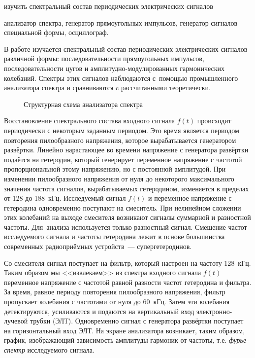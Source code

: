 
\begin{lab:aim}
	изучить спектральный состав периодических электрических сигналов
\end{lab:aim}

\begin{lab:equipment}
	анализатор спектра, генератор прямоугольных импульсов, генератор сигналов специальной формы, осциллограф.
\end{lab:equipment}

В работе изучается спектральный состав периодических электрических сигналов различной формы: последовательности прямоугольных импульсов, последовательности цугов и амплитудно-модулированных гармонических колебаний. Спектры этих сигналов наблюдаются с~помощью промышленного анализатора спектра и сравниваются c рассчитанными теоретически.

%

\begin{figure}
	\label{fig:1}
	\caption{Структурная схема анализатора спектра}
\end{figure}

Восстановление спектрального состава входного сигнала $f(t)$ происходит периодически с некоторым заданным периодом. Это время является периодом повторения пилообразного напряжения, которое вырабатывается генератором развёртки. Линейно нарастающее во времени напряжение с генератора развёртки подаётся на гетеродин, который генерирует переменное напряжение с частотой пропорциональной этому напряжению, но с постоянной амплитудой. При изменении пилообразного напряжения от нуля до некоторого максимального значения частота сигналов, вырабатываемых гетеродином, изменяется в пределах от 128 до 188~кГц. Исследуемый сигнал $f(t)$ и переменное напряжение с гетеродина одновременно поступают на смеситель. При нелинейном сложении этих колебаний на выходе смесителя возникают сигналы суммарной и разностной частоты. Для~анализа используется только разностный сигнал. Смешение частот исследуемого сигнала и частоты гетеродина лежит в основе большинства современных радиоприёмных устройств~--- супергетеродинов.

Со смесителя сигнал поступает на фильтр, который настроен на частоту 128~кГц. Таким образом мы <<извлекаем>> из спектра входного  сигнала $f(t)$ переменное напряжение с частотой равной разности частот гетеродина и фильтра. За время, равное периоду повторения пилообразного напряжения, фильтр пропускает колебания с частотами от нуля до 60~кГц. Затем эти колебания детектируются, усиливаются и подаются на вертикальный вход электронно-лучевой трубки (ЭЛТ). Одновременно сигнал с генератора развёртки поступает на горизонтальный вход ЭЛТ. На экране анализатора возникает, таким образом, график, изображающий зависимость амплитуды гармоник от частоты, т.е. \emph{фурье-спектр} исследуемого сигнала.

